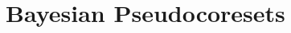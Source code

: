 \chapter{Bayesian Pseudocoresets}
\label{chap:chap4}
\renewcommand*{\MyPath}{../Chapter4}%







%
%
%
%